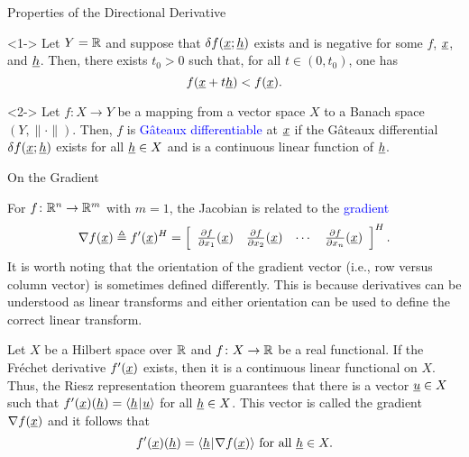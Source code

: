 \documentclass[10pt,english,aspectratio=169]{beamer}
\begin{document}
\begin{frame}{Properties of the Directional Derivative}

\begin{lemma}<1->
Let $Y=\mathbb{R}$ and suppose that $\delta f (\underline{x};\underline{h})$ exists and is negative for some $f$, $\underline{x}$, and $\underline{h}$.  Then, there exists $t_0 > 0$ such that, for all $t\in(0,t_0)$, one has \vspace{-2mm}
\[ f(\underline{x}+t \underline{h}) < f (\underline{x}). \]
\end{lemma}


\vspace{5mm}

\begin{definition}<2->
Let $f \colon X \rightarrow Y$ be a mapping from a vector space $X$ to a Banach space $(Y,\|\cdot\|)$.
Then, $f$ is \textcolor{blue}{G\^{a}teaux differentiable} at $\underline{x}$ if the G\^{a}teaux differential $\delta f (\underline{x};\underline{h})$ exists for all $\underline{h} \in X$ and is a continuous linear function of $\underline{h}$.
\end{definition}

\end{frame}


\begin{frame}{On the Gradient}

For $f\colon \mathbb{R}^n \to \mathbb{R}^m$ with $m=1$, the Jacobian is related to the \textcolor{blue}{gradient}
\[ \nabla f(\underline{x}) \triangleq f'(\underline{x})^H  = \left[ \begin{array}{cccc} \frac{\partial  f}{\partial  x_1} (\underline{x}) & \frac{\partial  f}{\partial  x_2} (\underline{x}) & \cdots & \frac{\partial  f}{\partial  x_n} (\underline{x}) \end{array} \right]^H. \]
It is worth noting that the orientation of the gradient vector (i.e., row versus column vector) is sometimes defined differently.
This is because derivatives can be understood as linear transforms and either orientation can be used to define the correct linear transform. 

\begin{example}
Let $X$ be a Hilbert space over $\mathbb{R}$ and $f\colon X \to \mathbb{R}$ be a real functional.
If the Fr\'{e}chet derivative $f'(\underline{x})$ exists, then it is a continuous linear functional on $X$.
Thus, the Riesz representation theorem guarantees that there is a vector $\underline{u} \in X$ such that
$ f'(\underline{x})(\underline{h}) = {\langle \underline{h}  \mskip1mu | \mskip1mu  \underline{u}  \rangle} $ for all $\underline{h}\in X$.
This vector is called the gradient $\nabla f(\underline{x})$ and it follows that \vspace{-1mm}
$$ f'(\underline{x})(\underline{h}) = {\langle \underline{h}  \mskip1mu | \mskip1mu  \nabla f (\underline{x})  \rangle} \text{ for all } \underline{h}\in X. $$
\end{example}

\end{frame}
\end{document}
